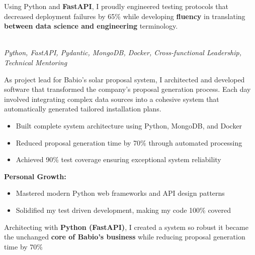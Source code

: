 \documentclass[a4paper,10pt]{article}
\begin{document}
{\begin{minipage}{\dimexpr\textwidth-2\fboxsep\relax}
		\vspace{0.2cm}

        Using Python and \textbf{FastAPI}, I proudly engineered testing protocols that decreased
        deployment failures by 65\% while developing \textbf{fluency} in translating
        \textbf{between data science and engineering} terminology.

		\vspace{0.4cm}

        \noindent\uline{} \\
		\vspace{0.1cm} \hspace{0.2cm}
		{\small\textit{Python, FastAPI, Pydantic, MongoDB, Docker, Cross-functional Leadership, Technical Mentoring}}

		As project lead for Babio's solar proposal system, I architected and developed software that transformed the company's proposal generation process. Each day involved integrating complex data sources into a cohesive system that automatically generated tailored installation plans.

		\vspace{0.2cm}
		\begin{itemize}[label=\textcolor{darkblue}{\textbullet}, leftmargin=*, nosep]
			\item Built complete system architecture using Python, MongoDB, and Docker
			\item Reduced proposal generation time by 70\% through automated processing
			\item Achieved 90\% test coverage ensuring exceptional system reliability
		\end{itemize}

		\vspace{0.2cm}
		\textbf{Personal Growth:}
		\vspace{0.2cm}
		\begin{itemize}[label=\textcolor{darkblue}{\textbullet}, leftmargin=*, nosep]
			\item Mastered modern Python web frameworks and API design patterns
			\item Solidified my test driven development, making my code 100\% covered
		\end{itemize}

		\vspace{0.4cm}

        Architecting with \textbf{Python (FastAPI)}, I created a system so robust it became the
        unchanged \textbf{core of Babio's business} while reducing proposal generation time by
        70\%


\end{minipage}}
\end{document}
